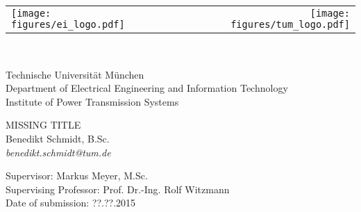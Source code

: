 \begin{titlepage}
	
	\begin{tabularx}{\linewidth}{@{}lXr@{}}
		\texttt{[image: figures/ei\_logo.pdf]} &	& \texttt{[image: figures/tum\_logo.pdf]}
	\end{tabularx}
	\hfill \\[1cm]
	
	\begin{flushleft}
		Technische Universität München \\
		Department of Electrical Engineering and Information Technology \\
		Institute of Power Transmission Systems \\[4cm]
	\end{flushleft}
		
	\begin{center}
		\huge
		MISSING TITLE \\[1cm]
		\large
		Benedikt Schmidt, B.Sc. \\
		\textit{benedikt.schmidt@tum.de} \\[7cm]
	\end{center}
	
	\begin{flushleft}
		Supervisor: Markus Meyer, M.Sc. \\
		Supervising Professor: Prof. Dr.-Ing. Rolf Witzmann \\
		Date of submission: ??.??.2015
	\end{flushleft}
\end{titlepage}